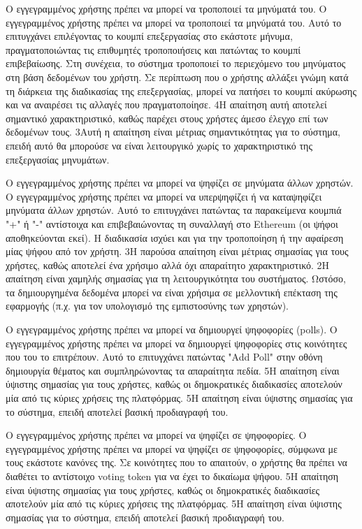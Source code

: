 \begin{enumerate}[label=\textbf{<ΛΑ-\arabic*>}, leftmargin=\parindent, align=left, labelwidth=\parindent, labelsep=0pt]
	\sysReqItem
		{\label{srs:functional-srs-modify-post}}
		{Ο εγγεγραμμένος χρήστης πρέπει να μπορεί να τροποποιεί τα μηνύματά του.}
		{Ο εγγεγραμμένος χρήστης πρέπει να μπορεί να τροποποιεί τα μηνύματά του. Αυτό το επιτυγχάνει επιλέγοντας το κουμπί επεξεργασίας στο εκάστοτε μήνυμα, πραγματοποιώντας τις επιθυμητές τροποποιήσεις και πατώντας το κουμπί επιβεβαίωσης. Στη συνέχεια, το σύστημα τροποποιεί το περιεχόμενο του μηνύματος στη βάση δεδομένων του χρήστη. Σε περίπτωση που ο χρήστης αλλάξει γνώμη κατά τη διάρκεια της διαδικασίας της επεξεργασίας, μπορεί να πατήσει το κουμπί ακύρωσης και να αναιρέσει τις αλλαγές που πραγματοποίησε.}
		{4}{Η απαίτηση αυτή αποτελεί σημαντικό χαρακτηριστικό, καθώς παρέχει στους χρήστες άμεσο έλεγχο επί των δεδομένων τους.}
		{3}{Αυτή η απαίτηση είναι μέτριας σημαντικότητας για το σύστημα, επειδή αυτό θα μπορούσε να είναι λειτουργικό χωρίς το χαρακτηριστικό της επεξεργασίας μηνυμάτων.}

	\sysReqItem
		{\label{srs:functional-srs-vote-posts}}
		{Ο εγγεγραμμένος χρήστης πρέπει να μπορεί να ψηφίζει σε μηνύματα άλλων χρηστών.}
		{Ο εγγεγραμμένος χρήστης πρέπει να μπορεί να υπερψηφίζει ή να καταψηφίζει μηνύματα άλλων χρηστών. Αυτό το επιτυγχάνει πατώντας τα παρακείμενα κουμπιά "+" ή "-" αντίστοιχα και επιβεβαιώνοντας τη συναλλαγή στο Ethereum (οι ψήφοι αποθηκεύονται εκεί). Η διαδικασία ισχύει και για την τροποποίηση ή την αφαίρεση μίας ψήφου από τον χρήστη.}
		{3}{Η παρούσα απαίτηση είναι μέτριας σημασίας για τους χρήστες, καθώς αποτελεί ένα χρήσιμο αλλά όχι απαραίτητο χαρακτηριστικό.}
		{2}{Η απαίτηση είναι χαμηλής σημασίας για τη λειτουργικότητα του συστήματος. Ωστόσο, τα δημιουργημένα δεδομένα μπορεί να είναι χρήσιμα σε μελλοντική επέκταση της εφαρμογής (π.χ. για τον υπολογισμό της εμπιστοσύνης των χρηστών).}

	\sysReqItem
		{\label{srs:functional-srs-create-polls}}
		{Ο εγγεγραμμένος χρήστης πρέπει να μπορεί να δημιουργεί ψηφοφορίες (polls).}
		{Ο εγγεγραμμένος χρήστης πρέπει να μπορεί να δημιουργεί ψηφοφορίες στις κοινότητες που του το επιτρέπουν. Αυτό το επιτυγχάνει πατώντας "Add Poll" στην οθόνη δημιουργία θέματος και συμπληρώνοντας τα απαραίτητα πεδία.}
		{5}{Η απαίτηση είναι ύψιστης σημασίας για τους χρήστες, καθώς οι δημοκρατικές διαδικασίες αποτελούν μία από τις κύριες χρήσεις της πλατφόρμας.}
		{5}{Η απαίτηση είναι ύψιστης σημασίας για το σύστημα, επειδή αποτελεί βασική προδιαγραφή του.}

	\sysReqItem
		{\label{srs:functional-srs-vote-polls}}
		{Ο εγγεγραμμένος χρήστης πρέπει να μπορεί να ψηφίζει σε ψηφοφορίες.}
		{Ο εγγεγραμμένος χρήστης πρέπει να μπορεί να ψηφίζει σε ψηφοφορίες, σύμφωνα με τους εκάστοτε κανόνες της. Σε κοινότητες που το απαιτούν, ο χρήστης θα πρέπει να διαθέτει το αντίστοιχο voting token για να έχει το δικαίωμα ψήφου.}
		{5}{Η απαίτηση είναι ύψιστης σημασίας για τους χρήστες, καθώς οι δημοκρατικές διαδικασίες αποτελούν μία από τις κύριες χρήσεις της πλατφόρμας.}
		{5}{Η απαίτηση είναι ύψιστης σημασίας για το σύστημα, επειδή αποτελεί βασική προδιαγραφή του.}


\end{enumerate}
